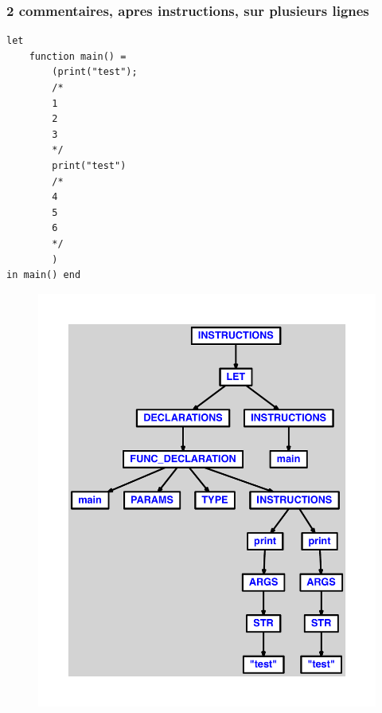 \documentclass{article}
\begin{document}
\subsubsection{2 commentaires, apres instructions, sur plusieurs lignes}
\begin{lstlisting}
let
	function main() =
		(print("test");
		/*
		1
		2
		3
		*/
		print("test")
		/*
		4
		5
		6
		*/
		)
in main() end
\end{lstlisting}
\newpage
\begin{figure}[H]
\centering
\includegraphics[max width=\textwidth]{ast/ast_157.pdf}
\end{figure}
\newpage
\end{document}
